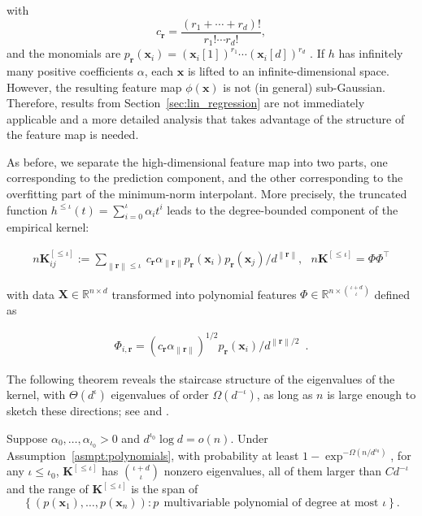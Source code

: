 	with
		$$c_{{\boldsymbol r}} = \frac{(r_1+\cdots+r_d)!}{r_1!\cdots r_d!},$$ and the monomials are $p_{{\boldsymbol r}}({\boldsymbol x}_i) = ({\boldsymbol x}_i[1])^{r_1}\cdots
        ({\boldsymbol x}_i[d])^{r_d}$ . If $h$ has infinitely many positive coefficients $\alpha$, each ${\boldsymbol x}$ is lifted to an infinite-dimensional space. However, the resulting feature map $\phi({\boldsymbol x})$ is not (in general) sub-Gaussian. Therefore, results from Section~\ref{sec:lin_regression} are not immediately applicable and a more detailed analysis that takes advantage of the structure of the feature map is needed.

As before, we separate the high-dimensional feature map into two parts, one corresponding to the prediction component, and the other corresponding to the overfitting part of the minimum-norm interpolant. More precisely, the truncated function $h^{\leq \iota}(t) = \sum_{i=0}^\iota \alpha_i t^i$ leads to the degree-bounded component of the empirical kernel:

\begin{align*}
		n \boldsymbol{K}_{ij}^{[\leq \iota]} :=  \sum_{\left\|{\boldsymbol r}\right\|\leq \iota}~ c_{{\boldsymbol r}} \alpha_{\left\|{\boldsymbol r}\right\|} p_{{\boldsymbol r}}({\boldsymbol x}_i) p_{{\boldsymbol r}}({\boldsymbol x}_j)/ d^{\left\|{\boldsymbol r}\right\|},~~~ n \boldsymbol{K}^{[\leq \iota]} =\Phi \Phi^\top
	\end{align*}

	with data ${\boldsymbol X}\in{\mathbb R}^{n\times d}$ transformed into polynomial features $\Phi \in {\mathbb R}^{n \times \binom{\iota+d}{\iota}}$ defined as

\begin{align*}
		\Phi_{i, {\boldsymbol r}} = \left(c_{{\boldsymbol r}} \alpha_{\left\|{\boldsymbol r}\right\|}\right)^{1/2}  p_{{\boldsymbol r}}({\boldsymbol x}_i) / d^{\left\|{\boldsymbol r}\right\|/2} \enspace.
	\end{align*}

	The following theorem reveals the staircase structure of the eigenvalues of the kernel, with $\Theta(d^{\iota})$ eigenvalues of order $\Omega(d^{-\iota})$, as long as $n$ is large enough to sketch these directions; see \cite{liang2020multiple} and \cite{ghorbani2020linearized}.

\begin{theorem}
		\label{thm:structure_eigenvalues_polynomials}
		Suppose $\alpha_0,\ldots,\alpha_{\iota_0}>0$ and
        $d^{\iota_0}\log d = o(n)$. Under
        Assumption~\ref{asmpt:polynomials}, with probability at least
        $1-\exp^{-\Omega(n/d^{\iota_0})}$, for any $\iota\leq
        \iota_0$, $\boldsymbol{K}^{[\leq \iota]}$ has ${\iota +
        d}\choose \iota$ nonzero eigenvalues, all of them larger than $C d^{-\iota}$ and the range of $\boldsymbol{K}^{[\leq
        \iota]}$ is the span of
        $$\left\{(p({\boldsymbol x}_1),\ldots,p({\boldsymbol x}_n)): p~~ \text{multivariable polynomial of degree at most } \iota \right\}.$$
	\end{theorem}

